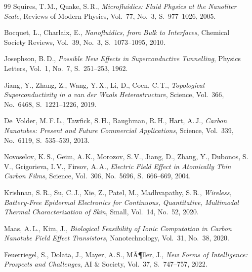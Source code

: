 ﻿\documentclass[a4paper,12pt]{scrreprt}
\theoremstyle{definition}
\begin{document}
\begin{thebibliography}{99}
	Squires, T.\,M., Quake, S.\,R.,
	\textit{Microfluidics: Fluid Physics at the Nanoliter Scale},
	Reviews of Modern Physics, Vol.~77, No.~3, S.~977--1026, 2005.
	
	Bocquet, L., Charlaix, E.,
	\textit{Nanofluidics, from Bulk to Interfaces},
	Chemical Society Reviews, Vol.~39, No.~3, S.~1073--1095, 2010.
	
	Josephson, B.\,D.,
	\textit{Possible New Effects in Superconductive Tunnelling},
	Physics Letters, Vol.~1, No.~7, S.~251--253, 1962.
	
	Jiang, Y., Zhang, Z., Wang, Y.\,X., Li, D., Coen, C.\,T.,
	\textit{Topological Superconductivity in a van der Waals Heterostructure},
	Science, Vol.~366, No.~6468, S.~1221--1226, 2019.
	
	De~Volder, M.\,F.\,L., Tawfick, S.\,H., Baughman, R.\,H., Hart, A.\,J.,
	\textit{Carbon Nanotubes: Present and Future Commercial Applications},
	Science, Vol.~339, No.~6119, S.~535--539, 2013.
	
	Novoselov, K.\,S., Geim, A.\,K., Morozov, S.\,V., Jiang, D., Zhang, Y.,
	Dubonos, S.\,V., Grigorieva, I.\,V., Firsov, A.\,A.,
	\textit{Electric Field Effect in Atomically Thin Carbon Films},
	Science, Vol.~306, No.~5696, S.~666--669, 2004.
	
	Krishnan, S.\,R., Su, C.\,J., Xie, Z., Patel, M., Madhvapathy, S.\,R.,
	\textit{Wireless, Battery-Free Epidermal Electronics for Continuous,
		Quantitative, Multimodal Thermal Characterization of Skin},
	Small, Vol.~14, No.~52, 2020.
	
	Maas, A.\,L., Kim, J.,
	\textit{Biological Feasibility of Ionic Computation in Carbon Nanotube
		Field Effect Transistors},
	Nanotechnology, Vol.~31, No.~38, 2020.
	
	Feuerriegel, S., Dolata, J., Mayer, A.\,S., MÃ¶ller, J.,
	\textit{New Forms of Intelligence: Prospects and Challenges},
	AI \& Society, Vol.~37, S.~747--757, 2022.
	
\end{thebibliography}
	
\end{document}
